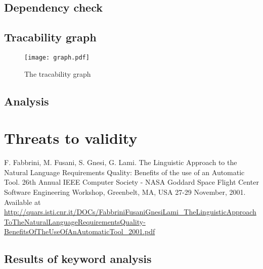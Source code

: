 \documentclass[a4paper,twoside,11pt]{article}
\begin{document}
\subsection{Dependency check}
\subsection{Tracability graph}
\begin{figure}[h]
\texttt{[image: graph.pdf]}
\label{trac_graph}
\centering
\caption{The tracability graph}
\end{figure}
\subsection{Analysis}

\section{Threats to validity}

\begin{thebibliography}{9}
F. Fabbrini, M. Fusani, S. Gnesi, G. Lami. The Linguistic Approach to the Natural Language Requirements Quality: Benefits of the use of an Automatic Tool. 26th Annual IEEE Computer Society - NASA Goddard Space Flight Center Software Engineering Workshop, Greenbelt, MA, USA 27-29 November, 2001. Available at \url{http://quars.isti.cnr.it/DOCs/FabbriniFusaniGnesiLami\_TheLinguisticApproachToTheNaturalLanguageRequirementsQuality-BenefitsOfTheUseOfAnAutomaticTool\_2001.pdf}
 \end{thebibliography}

\newpage
\begin{appendices}
\section{Results of keyword analysis} \label{appendix:analysis}

\noindent	
\end{appendices}
\end{document}

